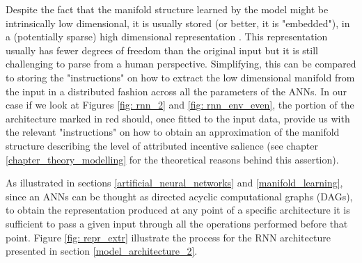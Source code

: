 Despite the fact that the manifold structure learned by the model might be intrinsically low dimensional, it is usually stored (or better, it is "embedded"), in a (potentially sparse) high dimensional representation \cite{bengio2017deep}. This representation usually has fewer degrees of freedom than the original input but it is still challenging to parse from a human perspective. Simplifying, this can be compared to storing the "instructions" on how to extract the low dimensional manifold from the input in a distributed fashion across all the parameters of the ANNs. In our case if we look at Figures \ref{fig: rnn_2} and \ref{fig: rnn_env_even}, the portion of the architecture marked in red should, once fitted to the input data, provide us with the relevant "instructions" on how to obtain an approximation of the manifold structure describing the level of attributed incentive salience (see chapter \ref{chapter_theory_modelling} for the theoretical reasons behind this assertion).

As illustrated in sections \ref{artificial_neural_networks} and \ref{manifold_learning}, since an ANNs can be thought as directed acyclic computational graphs (DAGs), to obtain the representation produced at any point of a specific architecture it is sufficient to pass a given input through all the operations performed before that point. Figure \ref{fig: repr_extr} illustrate the process for the RNN architecture presented in section \ref{model_architecture_2}.

